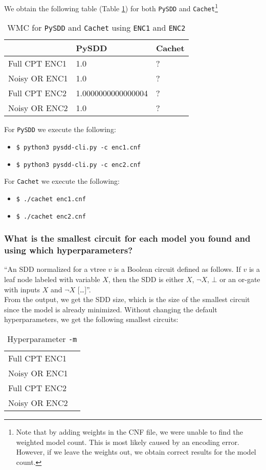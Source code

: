 \documentclass{article}
\begin{document}
We obtain the following table (Table \ref{tab:wmc_pysdd_cachet}) for both \texttt{PySDD} and \texttt{Cachet}\footnote{Note that by adding weights in the CNF file, we were unable to find the weighted model count. This is most likely caused by an encoding error. However, if we leave the weights out, we obtain correct results for the model count.}
\begin{table}[h]
\centering
\begin{tabular}{l | l l}
					&	PySDD	&		Cachet	\\\hline
	Full CPT ENC1	&	1.0		&		?		\\
	Noisy OR ENC1	&	1.0		&		?		\\
	Full CPT ENC2	&	1.0000000000000004 &	?	\\
	Noisy OR ENC2	&	1.0		&		?		\\
\end{tabular}
\caption{WMC for \texttt{PySDD} and \texttt{Cachet} using \texttt{ENC1} and \texttt{ENC2}}
\label{tab:wmc_pysdd_cachet}
\end{table}

For \texttt{PySDD} we execute the following:
\begin{itemize}
	\item[] \texttt{\$ python3 pysdd-cli.py -c enc1.cnf}
	\item[] \texttt{\$ python3 pysdd-cli.py -c enc2.cnf}
\end{itemize}

For \texttt{Cachet} we execute the following:
\begin{itemize}
	\item[] \texttt{\$ ./cachet enc1.cnf}
	\item[] \texttt{\$ ./cachet enc2.cnf}
\end{itemize}

\subsubsection{What is the smallest circuit for each model you found and using which hyperparameters?}
``An SDD normalized for a vtree $v$ is a Boolean circuit defined as follows. If $v$ is a leaf node labeled with variable $X$, then the SDD is either $X$, $\neg X$, $\bot$ or an or-gate with inputs $X$ and $\neg X$ [\dots]''\cite{shen}.\\
From the output, we get the SDD size, which is the size of the smallest circuit since the model is already minimized.
Without changing the default hyperparameters, we get the following smallest circuits:
\begin{table}
\centering
\begin{tabular}{l | l}
					&	\\\hline
	Full CPT ENC1	&		\\
	Noisy OR ENC1	&		\\
	Full CPT ENC2	&		\\
	Noisy OR ENC2	&		\\
\end{tabular}
\caption{Hyperparameter \texttt{-m}}
\end{table}
\end{document}

